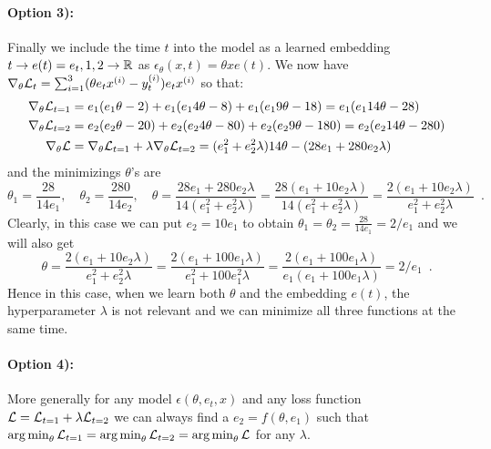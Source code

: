 \paragraph{Option 3):} 
Finally we include the time $t$ into the model as a learned embedding $t \to e(t) = e_t, {1,2} \to \mathbb{R}$ as $\epsilon_{\theta}(x, t) = \theta x e(t)$.
We now have $\nabla_{\theta} \mathcal{L}_{t} = \sum_{i=1}^3 (\theta e_t x^{(i)} - y^{(i)}_t) e_t x^{(i)}$ so that:
\begin{align}
\nabla_{\theta} \mathcal{L}_{t=1} & = e_1(e_1 \theta - 2) + e_1(e_1 4 \theta - 8) + e_1(e_1 9 \theta - 18) = e_1 (e_1 14 \theta - 28) \nonumber \\
\nabla_{\theta} \mathcal{L}_{t=2} & = e_2(e_2 \theta - 20) + e_2(e_2 4 \theta - 80) + e_2(e_2 9 \theta - 180) = e_2(e_2 14 \theta - 280) \nonumber \\
\nabla_{\theta} \mathcal{L} & = \nabla_{\theta} \mathcal{L}_{t=1} + \lambda \nabla_{\theta} \mathcal{L}_{t=2} = (e_1^2 + e_2^2 \lambda) 14 \theta - (28 e_1 + 280 e_2 \lambda)
\end{align}
and the minimizings $\theta$'s are 
\begin{equation}
\theta_{1} = \frac{28}{14 e_1}, \quad \theta_2 = \frac{280}{14 e_2}, \quad \theta = \frac{28 e_1 + 280 e_2 \lambda}{14 (e_1^2 + e_2^2 \lambda)} = \frac{28 (e_1 + 10 e_2 \lambda)}{14 (e_1^2 + e_2^2 \lambda)} = \frac{2 (e_1 + 10 e_2 \lambda)}{e_1^2 + e_2^2 \lambda} \enspace .
\end{equation}
Clearly, in this case we can put $e_2 = 10 e_1$ to obtain $\theta_{1} = \theta_{2} = \frac{28}{14 e_1} = 2 / e_1$ and we will also get
\begin{equation}
\theta = \frac{2 (e_1 + 10 e_2 \lambda)}{e_1^2 + e_2^2 \lambda} = \frac{2 (e_1 + 100 e_1 \lambda)}{e_1^2 + 100 e_1^2 \lambda} = \frac{2 (e_1 + 100 e_1 \lambda)}{e_1 (e_1 + 100 e_1 \lambda)} = 2 / e_1 \enspace . 
\end{equation}
Hence in this case, when we learn both $\theta$ and the embedding $e(t)$, the hyperparameter $\lambda$ is not relevant and we can minimize all three functions at the same time.

\paragraph{Option 4):} 
More generally for any model $\epsilon(\theta, e_t, x)$ and any loss function $\mathcal{L} = \mathcal{L}_{t=1} + \lambda \mathcal{L}_{t=2}$ we can always find a $e_2 = f(\theta, e_1)$ such that $\operatorname*{arg\,min}_\theta \mathcal{L}_{t=1} = \operatorname*{arg\,min}_\theta \mathcal{L}_{t=2} = \operatorname*{arg\,min}_\theta \mathcal{L}$ for any $\lambda$.








